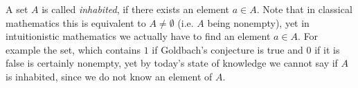 \documentclass[12pt]{article}
\begin{document}
A set $A$ is called \emph{inhabited}, if there exists an element $a\in A$. Note that in classical mathematics this is equivalent to $A\neq\emptyset$ (i.e. $A$ being nonempty), yet in intuitionistic mathematics we actually have to find an element $a\in A$. 
For example the set, which contains $1$ if Goldbach's conjecture is true and $0$ if it is false is certainly nonempty, yet by today's state of knowledge we cannot say if $A$ is inhabited, since we do not know an element of $A$.
\end{document}
